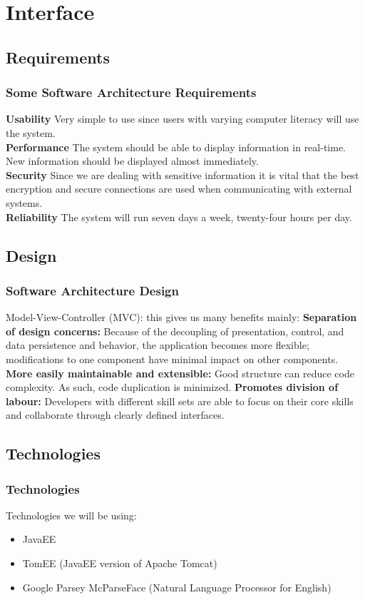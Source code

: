 \documentclass{beamer}
\begin{document}
	\section{Interface}
		
	\subsection{Requirements}
		\begin{frame}
		\frametitle{Some Software Architecture Requirements}
			\textbf{Usability} Very simple to use since users with varying computer literacy will use the system.\\
			\textbf{Performance} The system should be able to display information in real-time. New information should be displayed almost immediately.\\
			\textbf{Security} Since we are dealing with sensitive information it is vital that the best encryption and secure connections are used when communicating with external systems.\\
			\textbf{Reliability} The system will run seven days a week, twenty-four hours per day.
		\end{frame}
		
	\subsection{Design}
		\begin{frame}
		\frametitle{Software Architecture Design}
		 Model-View-Controller (MVC): this gives us many benefits mainly:
         	\textbf{Separation of design concerns:} Because of the decoupling of presentation, control, and data persistence and behavior, the application becomes more ﬂexible; modifications to one component have minimal impact on other components.\\
        	\textbf{More easily maintainable and extensible:} Good structure can reduce code complexity. As such, code duplication is minimized.
        	\textbf{Promotes division of labour:} Developers with different skill sets are able to focus on their core skills and collaborate through clearly defined interfaces.\\
		\end{frame}
		
	\subsection{Technologies}
			\begin{frame}
			\frametitle{Technologies}
				Technologies we will be using:
				\begin{itemize}
					\item JavaEE
					\item TomEE (JavaEE version of Apache Tomcat)
					\item Google Parsey McParseFace (Natural Language Processor for English)
				\end{itemize}
			\end{frame}
			
\end{document}
